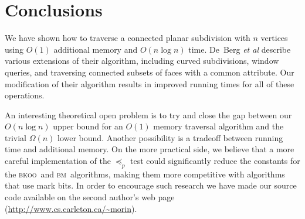 \documentclass{article}
\newcommand{\seclabel}[1]{\label{sec:#1}}
\newcommand{\bkoo}{\textsc{bkoo}}
\newcommand{\bosemorin}{\textsc{bm}}
\newcommand{\etal}{\emph{et al}}
\begin{document}
\section{Conclusions}\seclabel{conclusions}

We have shown how to traverse a connected planar subdivision with $n$
vertices using $O(1)$ additional memory and $O(n\log n)$ time.
\mbox{De Berg} \etal\cite{bkoo97} describe various extensions of
their algorithm, including curved subdivisions, window queries, and
traversing connected subsets of faces with a common attribute.  Our
modification of their algorithm results in improved running times for
all of these operations.  

An interesting theoretical open problem is to try and close the gap
between our $O(n\log n)$ upper bound for an $O(1)$ memory traversal
algorithm and the trivial $\Omega(n)$ lower bound.  Another
possibility is a tradeoff between running time and additional memory.
On the more practical side, we believe that a more careful
implementation of the $\preceq_p$ test could significantly reduce the
constants for the \bkoo\ and \bosemorin\ algorithms, making them more
competitive with algorithms that use mark bits.  In order to
encourage such research we have made our source code available on the
second author's web page (\url{http://www.cs.carleton.ca/~morin}).



\end{document}
